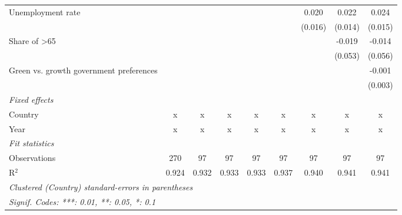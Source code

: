 \begin{table}[htbp]
\begin{tabular}{lcccccccc}
      Unemployment rate                           &         &         &         &         &              & 0.020        & 0.022        & 0.024\\   
                                                  &         &         &         &         &              & (0.016)      & (0.014)      & (0.015)\\   
      Share of >65                                &         &         &         &         &              &              & -0.019       & -0.014\\   
                                                  &         &         &         &         &              &              & (0.053)      & (0.056)\\   
      Green vs. growth government preferences     &         &         &         &         &              &              &              & -0.001\\   
                                                  &         &         &         &         &              &              &              & (0.003)\\   
      \emph{Fixed effects}\\
      Country                                     & x       & x       & x       & x       & x            & x            & x            & x\\  
      Year                                        & x       & x       & x       & x       & x            & x            & x            & x\\  
      \midrule \emph{Fit statistics}\\
      Observations                                & 270     & 97      & 97      & 97      & 97           & 97           & 97           & 97\\  
      R$^2$                                       & 0.924   & 0.932   & 0.933   & 0.933   & 0.937        & 0.940        & 0.941        & 0.941\\  
      \midrule
      \multicolumn{9}{l}{\emph{Clustered (Country) standard-errors in parentheses}}\\
      \multicolumn{9}{l}{\emph{Signif. Codes: ***: 0.01, **: 0.05, *: 0.1}}\\
   \end{tabular}
\end{table}


